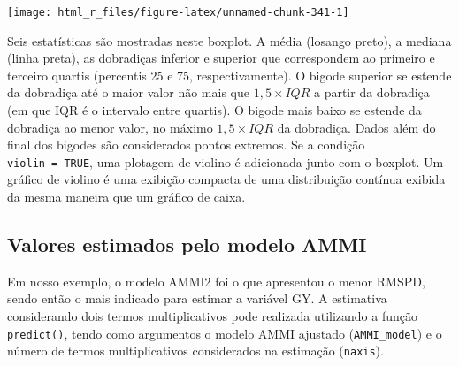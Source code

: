 \documentclass[
]{book}
\newenvironment{Shaded}{\begin{snugshade}}{\end{snugshade}}
\newcommand{\CommentTok}[1]{\textcolor[rgb]{0.56,0.35,0.01}{\textit{#1}}}
\newcommand{\DataTypeTok}[1]{\textcolor[rgb]{0.13,0.29,0.53}{#1}}
\newcommand{\DecValTok}[1]{\textcolor[rgb]{0.00,0.00,0.81}{#1}}
\newcommand{\KeywordTok}[1]{\textcolor[rgb]{0.13,0.29,0.53}{\textbf{#1}}}
\newcommand{\NormalTok}[1]{#1}
\newcommand{\OperatorTok}[1]{\textcolor[rgb]{0.81,0.36,0.00}{\textbf{#1}}}
\newcommand{\StringTok}[1]{\textcolor[rgb]{0.31,0.60,0.02}{#1}}
\begin{document}
\texttt{[image: html\_r\_files/figure-latex/unnamed-chunk-341-1]}

Seis estatísticas são mostradas neste boxplot. A média (losango preto), a mediana (linha preta), as dobradiças inferior e superior que correspondem ao primeiro e terceiro quartis (percentis 25 e 75, respectivamente). O bigode superior se estende da dobradiça até o maior valor não mais que \(1,5 \times {IQR}\) a partir da dobradiça (em que IQR é o intervalo entre quartis). O bigode mais baixo se estende da dobradiça ao menor valor, no máximo \(1,5 \times {IQR}\) da dobradiça. Dados além do final dos bigodes são considerados pontos extremos. Se a condição \texttt{violin\ =\ TRUE}, uma plotagem de violino é adicionada junto com o boxplot. Um gráfico de violino é uma exibição compacta de uma distribuição contínua exibida da mesma maneira que um gráfico de caixa.

\hypertarget{valores-estimados-pelo-modelo-ammi}{%
\subsection{Valores estimados pelo modelo AMMI}\label{valores-estimados-pelo-modelo-ammi}}

Em nosso exemplo, o modelo AMMI2 foi o que apresentou o menor RMSPD, sendo então o mais indicado para estimar a variável GY. A estimativa considerando dois termos multiplicativos pode realizada utilizando a função \texttt{predict()}, tendo como argumentos o modelo AMMI ajustado (\texttt{AMMI\_model}) e o número de termos multiplicativos considerados na estimação (\texttt{naxis}). 

\begin{Shaded}
\end{Shaded}
\end{document}
